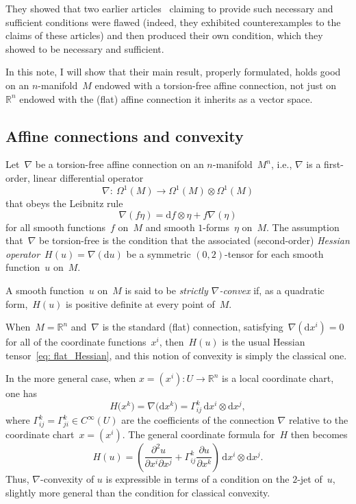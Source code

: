 \documentclass[10pt,a4paper]{amsart}
\renewcommand{\d}{\mathrm{d}}%
\newcommand{\bbR}{{\mathbb R}}
\numberwithin{equation}{section}
\begin{document}
They showed that two earlier articles~\cite{MR1655519,MR1652709}
claiming to provide such necessary and sufficient conditions were flawed
(indeed, they exhibited counterexamples to the claims of these articles)
and then produced their own condition,
which they showed to be necessary and sufficient.

In this note, I will show that their main result,
properly formulated, holds good on an $n$-manifold~$M$
endowed with a torsion-free affine connection,
not just on~$\bbR^n$ endowed with the (flat) affine connection
it inherits as a vector space.

\subsection{Affine connections and convexity}

Let~$\nabla$ be a torsion-free affine connection on an $n$-manifold~$M^n$,
i.e., $\nabla$ is a first-order, linear differential operator
\begin{equation*}
\nabla \colon \ \Omega^1(M)\to \Omega^1(M)\otimes \Omega^1(M)
\end{equation*}
that obeys the Leibnitz rule
\begin{equation*}
\nabla (f\eta) = \d f\otimes\eta + f \nabla(\eta)
\end{equation*}
for all smooth functions~$f$ on~$M$ and smooth $1$-forms~$\eta$ on~$M$.
The assumption that~$\nabla$ be torsion-free
is the condition that the associated (second-order)
\emph{Hessian operator}~$H(u)=\nabla(\d u)$
be a symmetric $(0,2)$-tensor for each smooth function~$u$ on~$M$.

A smooth function~$u$ on~$M$ is said to be {\it strictly $\nabla$-convex}
if, as a quadratic form,~$H(u)$ is positive definite at every point of~$M$.

When~$M=\bbR^n$ and~$\nabla$ is the standard (flat) connection,
satisfying~$\nabla(\d x^i) = 0$ for all of the coordinate functions~$x^i$,
then~$H(u)$ is the usual Hessian tensor~\eqref{eq: flat_Hessian},
and this notion of convexity is simply the classical one.

In the more general case, when $x = (x^i)\colon U\to \bbR^n$ is a local
coordinate chart, one has
\begin{equation*}
H\big(x^k\big) = \nabla\big(\d x^k\big) = \Gamma^k_{ij}\,\d x^i\otimes\d x^j,
\end{equation*}
where $\Gamma^k_{ij}=\Gamma^k_{ji}\in C^\infty(U)$
are the coefficients of the connection $\nabla$ relative
to the coordinate chart~$x=(x^i)$.
The general coordinate formula for~$H$ then becomes
\begin{equation*}
H(u) = \left(\frac{\partial^2 u}{\partial x^i\partial x^j}
+ \Gamma^k_{ij} \frac{\partial u}{\partial x^k}\right)
\,\d x^i\otimes\d x^j.
\end{equation*}
Thus, $\nabla$-convexity of $u$ is expressible in terms of a condition
on the $2$-jet of~$u$, slightly more general than the condition for
classical convexity.
\end{document}
